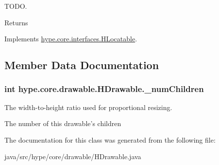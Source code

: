 T\-O\-D\-O. 

\begin{DoxyReturn}{Returns}

\end{DoxyReturn}


Implements \hyperlink{interfacehype_1_1core_1_1interfaces_1_1_h_locatable_a39eb12015a40fe494f789607dec9c484}{hype.\-core.\-interfaces.\-H\-Locatable}.



\subsection{Member Data Documentation}
\hypertarget{classhype_1_1core_1_1drawable_1_1_h_drawable_a3d2ec798d880968b25a5c81a8dd31357}{
\subsubsection[{\-\_\-num\-Children}]{\setlength{\rightskip}{0pt plus 5cm}int hype.\-core.\-drawable.\-H\-Drawable.\-\_\-num\-Children\hspace{0.3cm}{\ttfamily [protected]}}}\label{classhype_1_1core_1_1drawable_1_1_h_drawable_a3d2ec798d880968b25a5c81a8dd31357}


The width-\/to-\/height ratio used for proportional resizing. 

The number of this drawable's children 

The documentation for this class was generated from the following file\-:\begin{DoxyCompactItemize}
\item 
java/src/hype/core/drawable/H\-Drawable.\-java\end{DoxyCompactItemize}
